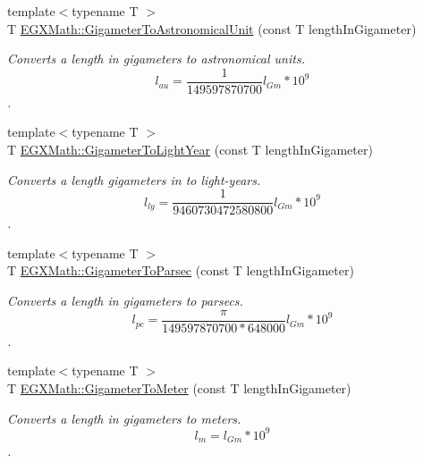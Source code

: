 \begin{DoxyCompactItemize}
\item 
{\footnotesize template$<$typename T $>$ }\\T \mbox{\hyperlink{group___e_g_x_math-_conversions-_length_conversions-_s_i-_gigameter-_astronomical_ga048b5af6ec2f33e28435823ffa238d17}{E\+G\+X\+Math\+::\+Gigameter\+To\+Astronomical\+Unit}} (const T length\+In\+Gigameter)
\begin{DoxyCompactList}\small\item\em Converts a length in gigameters to astronomical units. \[ l_{au}= \frac{1}{149597870700} l_{Gm} * 10^{9} \]. \end{DoxyCompactList}\item 
{\footnotesize template$<$typename T $>$ }\\T \mbox{\hyperlink{group___e_g_x_math-_conversions-_length_conversions-_s_i-_gigameter-_astronomical_ga352bdc453f4bccc2dd188f009c02ff62}{E\+G\+X\+Math\+::\+Gigameter\+To\+Light\+Year}} (const T length\+In\+Gigameter)
\begin{DoxyCompactList}\small\item\em Converts a length gigameters in to light-\/years. \[ l_{ly}= \frac{1}{9460730472580800} l_{Gm} * 10^{9} \]. \end{DoxyCompactList}\item 
{\footnotesize template$<$typename T $>$ }\\T \mbox{\hyperlink{group___e_g_x_math-_conversions-_length_conversions-_s_i-_gigameter-_astronomical_ga5a83442adf1a2b81447b7355527f5ec4}{E\+G\+X\+Math\+::\+Gigameter\+To\+Parsec}} (const T length\+In\+Gigameter)
\begin{DoxyCompactList}\small\item\em Converts a length in gigameters to parsecs. \[ l_{pc}=\frac{\pi}{149597870700 * 648000} l_{Gm} * 10^{9} \]. \end{DoxyCompactList}\item 
{\footnotesize template$<$typename T $>$ }\\T \mbox{\hyperlink{group___e_g_x_math-_conversions-_length_conversions-_s_i-_gigameter-_s_i_ga9573f9c296bf9043de80f6f6b13c0aa9}{E\+G\+X\+Math\+::\+Gigameter\+To\+Meter}} (const T length\+In\+Gigameter)
\begin{DoxyCompactList}\small\item\em Converts a length in gigameters to meters. \[ l_{m}=l_{Gm} * 10^{9}\]. \end{DoxyCompactList}\item 

\end{DoxyCompactItemize}
